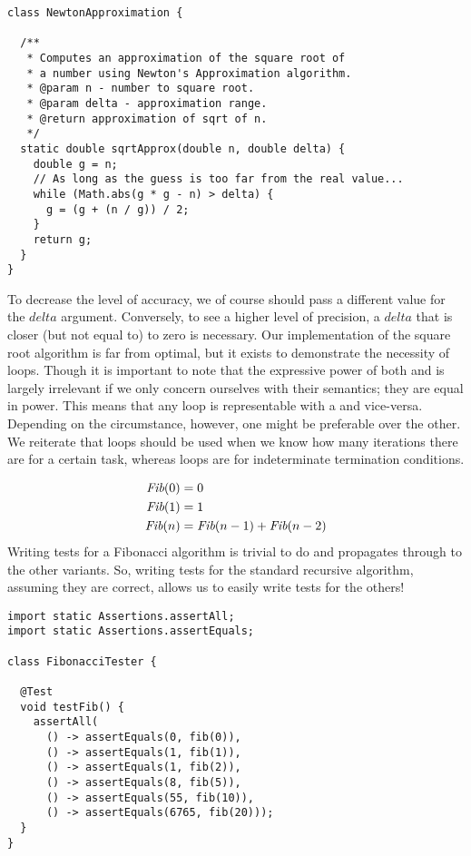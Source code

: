 \begin{lstlisting}[language=MyJava]
class NewtonApproximation {

  /**
   * Computes an approximation of the square root of
   * a number using Newton's Approximation algorithm.
   * @param n - number to square root.
   * @param delta - approximation range.
   * @return approximation of sqrt of n.
   */
  static double sqrtApprox(double n, double delta) {
    double g = n;
    // As long as the guess is too far from the real value...
    while (Math.abs(g * g - n) > delta) {
      g = (g + (n / g)) / 2;
    }
    return g;
  }
}
\end{lstlisting}

To decrease the level of accuracy, we of course should pass a different value for the $\mathit{delta}$ argument. Conversely, to see a higher level of precision, a $\mathit{delta}$ that is closer (but not equal to) to zero is necessary. Our implementation of the square root algorithm is far from optimal, but it exists to demonstrate the necessity of  loops. Though it is important to note that the expressive power of both  and  is largely irrelevant if we only concern ourselves with their semantics; they are equal in power. This means that any  loop is representable with a  and vice-versa. Depending on the circumstance, however, one might be preferable over the other. We reiterate that  loops should be used when we know how many iterations there are for a certain task, whereas  loops are for indeterminate termination conditions. 

\begin{align*}
  \emph{Fib}(0) &= 0\\
  \emph{Fib}(1) &= 1\\
  \emph{Fib}(n) &= \emph{Fib}(n - 1) + \emph{Fib}(n - 2)
\end{align*}
Writing tests for a Fibonacci algorithm is trivial to do and propagates through to the other variants. So, writing tests for the standard recursive algorithm, assuming they are correct, allows us to easily write tests for the others!

\begin{lstlisting}[language=MyJava]
import static Assertions.assertAll;
import static Assertions.assertEquals;

class FibonacciTester {

  @Test
  void testFib() {
    assertAll(
      () -> assertEquals(0, fib(0)),
      () -> assertEquals(1, fib(1)),
      () -> assertEquals(1, fib(2)),
      () -> assertEquals(8, fib(5)),
      () -> assertEquals(55, fib(10)),
      () -> assertEquals(6765, fib(20)));
  }
}
\end{lstlisting}

